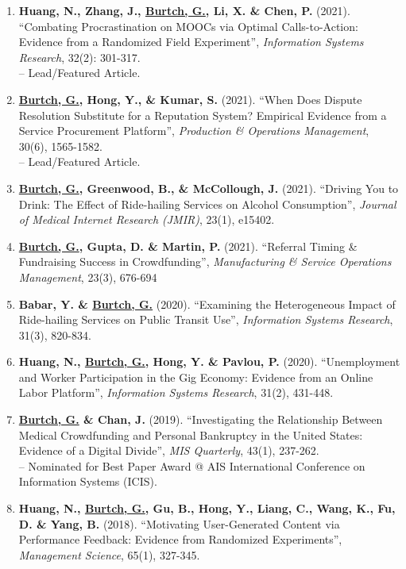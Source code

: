 \documentclass[10.5pt,letterpaper,sans]{moderncv}        %
\begin{document}
\begin{enumerate}[leftmargin=!,labelindent=5pt,itemindent=-15pt]
\item \textbf{Huang, N., Zhang, J., \underline{Burtch, G.}, Li, X. \& Chen, P.} (2021). ``Combating Procrastination on MOOCs via Optimal Calls-to-Action: Evidence from a Randomized Field Experiment'', \textit{Information Systems Research},  32(2): 301-317. \\-- Lead/Featured Article.

\item \textbf{\underline{Burtch, G.}, Hong, Y., \& Kumar, S.} (2021). ``When Does Dispute Resolution Substitute for a Reputation System? Empirical Evidence from a Service Procurement Platform'', \textit{Production \& Operations Management}, 30(6), 1565-1582.\\-- Lead/Featured Article.

\item \textbf{\underline{Burtch, G.}, Greenwood, B., \& McCollough, J.} (2021). ``Driving You to Drink: The Effect of Ride-hailing Services on Alcohol Consumption'', \textit{Journal of Medical Internet Research (JMIR)}, 23(1), e15402.

\item \textbf{\underline{Burtch, G.}, Gupta, D. \& Martin, P.} (2021). ``Referral Timing \& Fundraising Success in Crowdfunding'', \textit{Manufacturing \& Service Operations Management}, 23(3), 676-694

\item \textbf{Babar, Y. \& \underline{Burtch, G.}} (2020). ``Examining the Heterogeneous Impact of Ride-hailing Services on Public Transit Use'', \textit{Information Systems Research}, 31(3), 820-834.

\item \textbf{Huang, N., \underline{Burtch, G.}, Hong, Y. \& Pavlou, P.} (2020). ``Unemployment and Worker Participation in the Gig Economy: Evidence from an Online Labor Platform'', \textit{Information Systems Research}, 31(2), 431-448.

\item \textbf{\underline{Burtch, G.} \& Chan, J.} (2019). ``Investigating the Relationship Between Medical Crowdfunding and Personal Bankruptcy in the United States: Evidence of a Digital Divide'', \textit{MIS Quarterly}, 43(1), 237-262. \\-- Nominated for Best Paper Award @ AIS International Conference on Information Systems (ICIS).

\item \textbf{Huang, N., \underline{Burtch, G.}, Gu, B., Hong, Y., Liang, C., Wang, K., Fu, D. \& Yang, B.} (2018). ``Motivating User-Generated Content via Performance Feedback: Evidence from Randomized Experiments'', \textit{Management Science}, 65(1), 327-345.


\end{enumerate}
\end{document}
